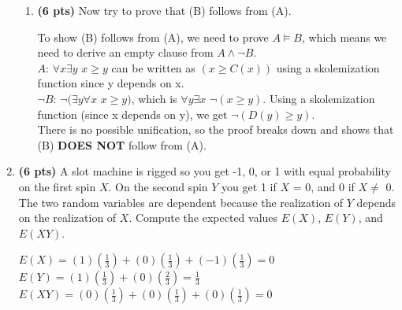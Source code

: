 \documentclass{article}
\begin{document}
\begin{enumerate}
\begin{enumerate}[label=($\alph*$)]


    \item \textbf{(6 pts)} Now try to prove that (B) follows from (A).

    \color{blue}
        To show (B) follows from (A), we need to prove $A \models B$, which means we need to derive an empty clause from $A \wedge \neg B$.\\
        $A$: $\forall x \exists y$ $x \geq y$ can be written as $(x \geq C(x))$ using a skolemization function since y depends on x.\\
        $\neg B$: $\neg (\exists y \forall x$ $x \geq y)$, which is $\forall y \exists x$ $\neg(x \geq y)$. Using a skolemization function (since x depends on y), we get $\neg (D(y) \geq y)$.\\
        There is no possible unification, so the proof breaks down and shows that (B) \textbf{DOES NOT }follow from (A).
    \color{black}

    
    \end{enumerate}



\item \textbf{(6 pts)} A slot machine is rigged so you get -1, 0, or 1 with equal probability on the first spin $X$. On the second spin $Y$ you get 1 if $X$ = 0, and 0 if $X \neq$ 0. The two random variables are dependent because the realization of $Y$ depends on the realization of $X$. Compute the expected values $E(X)$, $E(Y)$, and $E(XY)$.

\color{blue}
    $E(X) = (1)(\frac{1}{3}) + (0)(\frac{1}{3}) + (-1)(\frac{1}{3}) = 0$\\
    $E(Y) = (1)(\frac{1}{3}) + (0)(\frac{2}{3}) = \frac{1}{3}$\\
    $E(XY) = (0)(\frac{1}{3}) + (0)(\frac{1}{3}) + (0)(\frac{1}{3}) = 0$
\color{black}




\end{enumerate}
\end{document}
